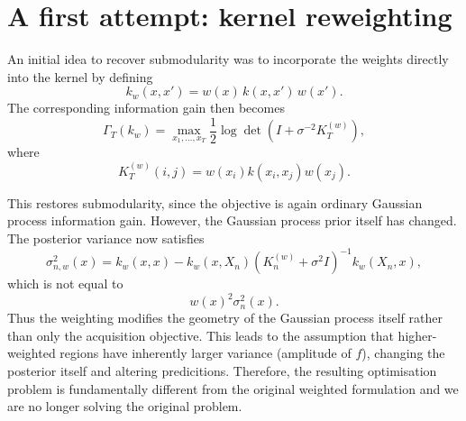 \section{A first attempt: kernel reweighting}

An initial idea to recover submodularity was to incorporate the weights directly into the kernel by defining
\begin{equation*}
k_w(x,x')
=
w(x)\,k(x,x')\,w(x').
\end{equation*}
The corresponding information gain then becomes
\begin{equation*}
\Gamma_T(k_w)
=
\max_{x_1,\dots,x_T} \frac{1}{2}
\log
\det
\left(
I+\sigma^{-2}K_T^{(w)}
\right),
\end{equation*}
where
\begin{equation*}
K_T^{(w)}(i,j)
=
w(x_i)k(x_i,x_j)w(x_j).
\end{equation*}

This restores submodularity, since the objective is again ordinary Gaussian process information gain. However, the Gaussian process prior itself has changed. The posterior variance now satisfies
\begin{equation*}
\sigma_{n,w}^2(x)
=
k_w(x,x)
-
k_w(x,X_n)
\left(
K_n^{(w)}+\sigma^2 I
\right)^{-1}
k_w(X_n,x),
\end{equation*}
which is not equal to
\begin{equation*}
w(x)^2\sigma_n^2(x).
\end{equation*}
Thus the weighting modifies the geometry of the Gaussian process itself rather than only the acquisition objective. This leads to the assumption that higher-weighted regions have inherently larger variance (amplitude of $f$), changing the posterior itself and altering predicitions. Therefore, the resulting optimisation problem is fundamentally different from the original weighted formulation and we are no longer solving the original problem. 
